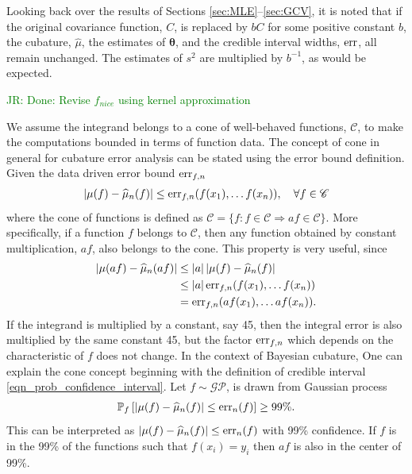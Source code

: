 \documentclass{iitthesis}          %
\newcommand{\bm}[1]{\boldsymbol{#1}}
\newcommand{\vtheta}{{\bm{\theta}}}
\newcommand{\hmu}{\widehat{\mu}}
\newcommand{\err}{\textup{err}}
\def\abs#1{\ensuremath{\left \lvert #1 \right \rvert}}
\newcommand{\JRNote}[1]{{\textcolor{green}{JR: #1}}}
\begin{document}
Looking back over the results of Sections  \ref{sec:MLE}--\ref{sec:GCV}, it is noted that if the original covariance function, $C$, is replaced by $b C$ for some positive constant $b$, the cubature, $\hmu$, the estimates of $\vtheta$, and the credible interval widths, $\err$, all remain unchanged.  The estimates of $s^2$ are multiplied by $b^{-1}$, as would be expected. 

\label{sec:cone_of_functions}

\JRNote{Done: Revise $f_{nice}$ using kernel approximation}

We assume the integrand belongs to a cone of well-behaved functions, $\mathscr{C}$, to make the computations bounded in terms of function data. The concept of cone in general for cubature error analysis can be stated using the error bound definition. Given the data driven error bound $\err_{f,n}$
\begin{align*}
\abs{\mu(f) - \hmu_n(f)} \le \err_{f,n}(f(x_1), \dots f(x_n)), \quad \forall f \in \mathscr{C}
\end{align*}  
where the cone of functions is defined as $\mathscr{C} = \{f : f \in \mathscr{C} \Rightarrow a f \in \mathscr{C} \}$. More specifically, if a function $f$ belongs to $\mathscr{C}$, then any function obtained by constant multiplication, $af$, also belongs to the cone. This property is very useful, since
\begin{align*}
\abs{\mu(a f) - \hmu_n(a f)} &\le \abs{a} \abs{\mu(f) - \hmu_n(f)} \\
& \le \abs{a} \err_{f,n}(f(x_1), \dots f(x_n)) \\
& = \err_{f,n}(a f(x_1), \dots a f(x_n)).
\end{align*}
If the integrand is multiplied by a constant, say 45, then the integral error is also multiplied by the same constant 45, but the factor $\err_{f,n}$ which depends on the characteristic of $f$ does not change.
In the context of Bayesian cubature, One can explain the cone concept beginning with the definition of credible interval \eqref{eqn_prob_confidence_interval}. 
Let $f \sim \mathcal{GP}$, is drawn from  Gaussian process
\begin{align*}
\mathbb{P}_f \left[
|\mu(f)-\hmu_n(f)| \leq \err_{n}(f) \right] \ge 99\%.
\end{align*}
This can be interpreted as $|\mu(f)-\hmu_n(f)| \leq \err_{n}(f)$ with 99\% confidence. If $f$ is in the 99\%  of the functions such that $f(x_i) = y_i$ then $af$ is also in the center of 99\%.
\end{document}

